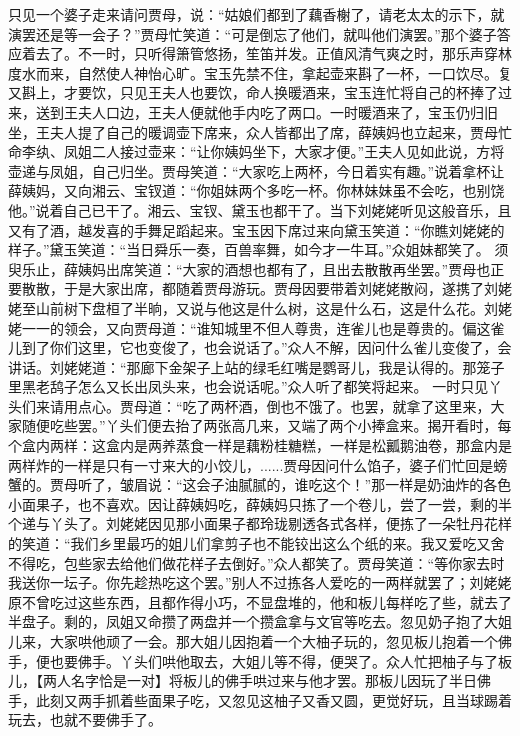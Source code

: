 \documentclass[12pt,oneside]{book}
\begin{document}
只见一个婆子走来请问贾母，说：“姑娘们都到了藕香榭了，请老太太的示下，就演罢还是等一会子？”贾母忙笑道：“可是倒忘了他们，就叫他们演罢。”那个婆子答应着去了。不一时，只听得箫管悠扬，笙笛并发。正值风清气爽之时，那乐声穿林度水而来，自然使人神怡心旷。宝玉先禁不住，拿起壶来斟了一杯，一口饮尽。复又斟上，才要饮，只见王夫人也要饮，命人换暖酒来，宝玉连忙将自己的杯捧了过来，送到王夫人口边，王夫人便就他手内吃了两口。一时暖酒来了，宝玉仍归旧坐，王夫人提了自己的暖调壶下席来，众人皆都出了席，薛姨妈也立起来，贾母忙命李纨、凤姐二人接过壶来：“让你姨妈坐下，大家才便。”王夫人见如此说，方将壶递与凤姐，自己归坐。贾母笑道：“大家吃上两杯，今日着实有趣。”说着拿杯让薛姨妈，又向湘云、宝钗道：“你姐妹两个多吃一杯。你林妹妹虽不会吃，也别饶他。”说着自己已干了。湘云、宝钗、黛玉也都干了。当下刘姥姥听见这般音乐，且又有了酒，越发喜的手舞足蹈起来。宝玉因下席过来向黛玉笑道：“你瞧刘姥姥的样子。”黛玉笑道：“当日舜乐一奏，百兽率舞，如今才一牛耳。”众姐妹都笑了。
须臾乐止，薛姨妈出席笑道：“大家的酒想也都有了，且出去散散再坐罢。”贾母也正要散散，于是大家出席，都随着贾母游玩。贾母因要带着刘姥姥散闷，遂携了刘姥姥至山前树下盘桓了半晌，又说与他这是什么树，这是什么石，这是什么花。刘姥姥一一的领会，又向贾母道：“谁知城里不但人尊贵，连雀儿也是尊贵的。偏这雀儿到了你们这里，它也变俊了，也会说话了。”众人不解，因问什么雀儿变俊了，会讲话。刘姥姥道：“那廊下金架子上站的绿毛红嘴是鹦哥儿，我是认得的。那笼子里黑老鸹子怎么又长出凤头来，也会说话呢。”众人听了都笑将起来。
一时只见丫头们来请用点心。贾母道：“吃了两杯酒，倒也不饿了。也罢，就拿了这里来，大家随便吃些罢。”丫头们便去抬了两张高几来，又端了两个小捧盒来。揭开看时，每个盒内两样：这盒内是两养蒸食一样是藕粉桂糖糕，一样是松瓤鹅油卷，那盒内是两样炸的一样是只有一寸来大的小饺儿，......贾母因问什么馅子，婆子们忙回是螃蟹的。贾母听了，皱眉说：“这会子油腻腻的，谁吃这个！”那一样是奶油炸的各色小面果子，也不喜欢。因让薛姨妈吃，薛姨妈只拣了一个卷儿，尝了一尝，剩的半个递与丫头了。刘姥姥因见那小面果子都玲珑剔透各式各样，便拣了一朵牡丹花样的笑道：“我们乡里最巧的姐儿们拿剪子也不能铰出这么个纸的来。我又爱吃又舍不得吃，包些家去给他们做花样子去倒好。”众人都笑了。贾母笑道：“等你家去时我送你一坛子。你先趁热吃这个罢。”别人不过拣各人爱吃的一两样就罢了；刘姥姥原不曾吃过这些东西，且都作得小巧，不显盘堆的，他和板儿每样吃了些，就去了半盘子。剩的，凤姐又命攒了两盘并一个攒盒拿与文官等吃去。忽见奶子抱了大姐儿来，大家哄他顽了一会。那大姐儿因抱着一个大柚子玩的，忽见板儿抱着一个佛手，便也要佛手。丫头们哄他取去，大姐儿等不得，便哭了。众人忙把柚子与了板儿，【两人名字恰是一对】将板儿的佛手哄过来与他才罢。那板儿因玩了半日佛手，此刻又两手抓着些面果子吃，又忽见这柚子又香又圆，更觉好玩，且当球踢着玩去，也就不要佛手了。
\end{document}
